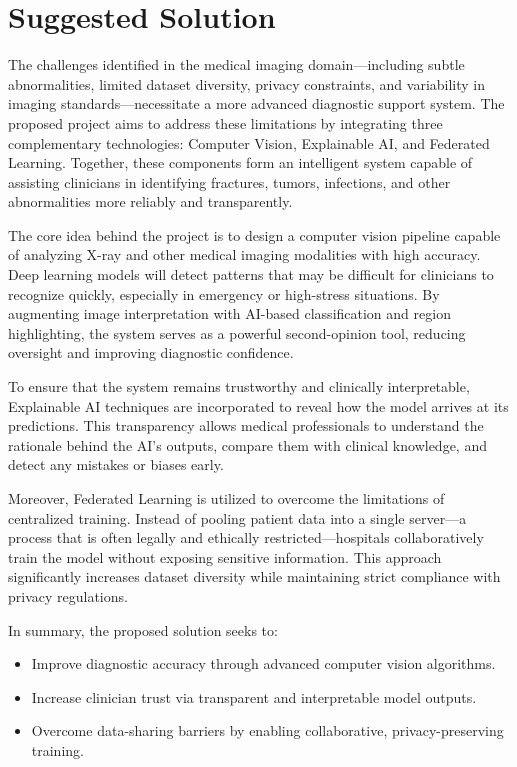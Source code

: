 \section{Suggested Solution}

The challenges identified in the medical imaging domain—including subtle abnormalities, limited dataset diversity, privacy constraints, and variability in imaging standards—necessitate a more advanced diagnostic support system. The proposed project aims to address these limitations by integrating three complementary technologies: Computer Vision, Explainable AI, and Federated Learning. Together, these components form an intelligent system capable of assisting clinicians in identifying fractures, tumors, infections, and other abnormalities more reliably and transparently.

The core idea behind the project is to design a computer vision pipeline capable of analyzing X-ray and other medical imaging modalities with high accuracy. Deep learning models will detect patterns that may be difficult for clinicians to recognize quickly, especially in emergency or high-stress situations. By augmenting image interpretation with AI-based classification and region highlighting, the system serves as a powerful second-opinion tool, reducing oversight and improving diagnostic confidence.

To ensure that the system remains trustworthy and clinically interpretable, Explainable AI techniques are incorporated to reveal how the model arrives at its predictions. This transparency allows medical professionals to understand the rationale behind the AI’s outputs, compare them with clinical knowledge, and detect any mistakes or biases early.

Moreover, Federated Learning is utilized to overcome the limitations of centralized training. Instead of pooling patient data into a single server—a process that is often legally and ethically restricted—hospitals collaboratively train the model without exposing sensitive information. This approach significantly increases dataset diversity while maintaining strict compliance with privacy regulations.

In summary, the proposed solution seeks to:

\begin{itemize}
	\item Improve diagnostic accuracy through advanced computer vision algorithms.
	\item Increase clinician trust via transparent and interpretable model outputs.
	\item Overcome data-sharing barriers by enabling collaborative, privacy-preserving training.
\end{itemize}

